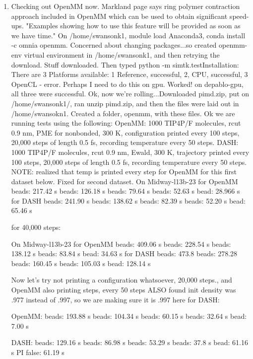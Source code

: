\documentclass[12pt,reqno]{amsart}
\numberwithin{equation}{section}
\begin{document}
\begin{enumerate}
\item Checking out OpenMM now. Markland page says ring polymer contraction approach included in OpenMM which can be used to obtain significant speed-ups.  "Examples showing how to use this feature will be provided as soon as we have time."  On /home/swansonk1, module load Anaconda3, conda install -c omnia openmm.  Concerned about changing packages...so created openmm-env virtual environment in /home/swansonk1, and then retrying the download.  Stuff downloaded. Then typed python -m simtk.testInstallation: There are 3 Platforms available: 1 Reference, successful, 2, CPU, successful, 3 OpenCL - error.  Perhaps I need to do this on gpu.  Worked!  on depablo-gpu, all three were successful.  Ok, now we're rolling...Downloaded pimd.zip, put on /home/swansonk1/, ran unzip pimd.zip, and then the files were laid out in /home/swansokn1.  Created a folder, openmm, with these files.  Ok we are running tests using the following: OpenMM: 1000 TIP4P/F molecules, rcut 0.9 nm, PME for nonbonded, 300 K, configuration printed every 100 steps, 20,000 steps of length 0.5 fs, recording temperature every 50 steps.  DASH: 1000 TIP4P/F molecules, rcut 0.9 nm, Ewald, 300 K, trajectory printed every 100 steps, 20,000 steps of length 0.5 fs, recording temperature every 50 steps.  NOTE: realized that temp is printed every step for OpenMM for this first dataset below.  Fixed for second dataset. 
\subitem On Midway-l13b-23 for OpenMM
 beads: 217.42 s
 beads: 126.18 s
 beads: 79.64 s
 beads: 52.63 s
 bead: 28.966 s
for DASH
 beads: 241.90 s
 beads: 138.62 s
 beads: 82.39 s
 beads: 52.20 s
 bead: 65.46 s

for 40,000 steps:

\subitem On Midway-l13b-23 for OpenMM
 beads: 409.06 s
 beads: 228.54 s
 beads: 138.12 s
 beads: 83.84 s
 bead: 34.63 s
for DASH
 beads: 473.8
 beads: 278.28
 beads: 160.45 s
 beads: 105.03 s
 bead: 128.14 s

Now let's try not printing a configuration whatsoever, 20,000 steps., and OpenMM also printing steps, every 50 steps ALSO found init density was .977 instead of .997, so we are making sure it is .997 here for DASH: 

OpenMM:
 beads: 193.88 s
 beads: 104.34 s
 beads: 60.15 s
 beads: 32.64 s
 bead: 7.00 s

DASH:
 beads: 129.16 s
 beads: 86.98 s
 beads: 53.29 s
 beads: 37.8 s
 bead: 61.16 s
\subitem PI false: 61.19 s

\end{enumerate}
\end{document}
